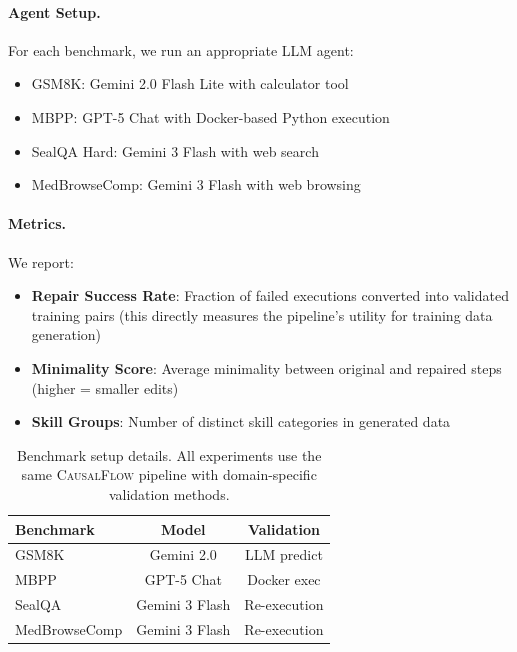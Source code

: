 \documentclass{article}
\theoremstyle{plain}
\theoremstyle{definition}
\theoremstyle{remark}
\begin{document}
\paragraph{Agent Setup.}
For each benchmark, we run an appropriate LLM agent:
\begin{itemize}
    \item GSM8K: Gemini 2.0 Flash Lite with calculator tool
    \item MBPP: GPT-5 Chat with Docker-based Python execution
    \item SealQA Hard: Gemini 3 Flash with web search
    \item MedBrowseComp: Gemini 3 Flash with web browsing
\end{itemize}

\paragraph{Metrics.}
We report:
\begin{itemize}
    \item \textbf{Repair Success Rate}: Fraction of failed executions converted into validated training pairs (this directly measures the pipeline's utility for training data generation)
    \item \textbf{Minimality Score}: Average minimality between original and repaired steps (higher = smaller edits)
    \item \textbf{Skill Groups}: Number of distinct skill categories in generated data
\end{itemize}

\begin{table}[t]
  \caption{Benchmark setup details. All experiments use the same \textsc{CausalFlow} pipeline with domain-specific validation methods.}
  \label{tab:benchmark_setup}
  \centering
  \begin{small}
    \begin{sc}
      \begin{tabular}{lcc}
        \toprule
        Benchmark & Model & Validation \\
        \midrule
        GSM8K & Gemini 2.0 & LLM predict\\
        MBPP & GPT-5 Chat & Docker exec \\
        SealQA & Gemini 3 Flash & Re-execution \\
        MedBrowseComp & Gemini 3 Flash & Re-execution\\
        \bottomrule
      \end{tabular}
    \end{sc}
  \end{small}
\end{table}
\end{document}
